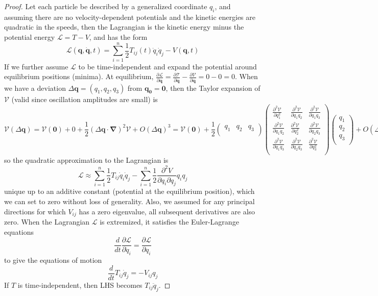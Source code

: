 \documentclass[a4paper]{article}
\begin{document}
\begin{proof}
Let each particle be described by a generalized coordinate $q_i$, and assuming there are no velocity-dependent potentials and the kinetic energies are quadratic in the speeds, then the Lagrangian is the kinetic energy minus the potential energy $\mathcal{L}=T-V$, and has the form
$$\mathcal{L}(\mathbf{q},\mathbf{\dot{q}},t)=\sum_{i=1}^n\frac{1}{2}T_{ij}(t)\dot{q}_i\dot{q}_j-V(\mathbf{q},t)$$
If we further assume $\mathcal{L}$ to be time-independent and expand the potential around equilibrium positions (minima). 
At equilibrium, $\frac{\partial\mathcal{L}}{\partial\mathbf{q}}=\frac{\partial\mathcal{T}}{\partial\mathbf{q}}-\frac{\partial\mathcal{V}}{\partial\mathbf{q}}=0-0=0$. When we have a deviation $\Delta\mathbf{q}=(q_1,q_2,q_3)$ from $\mathbf{q_0}=\boldsymbol{0}$, then the Taylor expansion of $\mathcal{V}$ (valid since oscillation amplitudes are small) is
$$\mathcal{V}(\Delta\mathbf{q})=\mathcal{V}(\boldsymbol{0})+0+\frac{1}{2}(\Delta\mathbf{q}\cdot\boldsymbol{\nabla})^2\mathcal{V}+O(\Delta\mathbf{q})^3=\mathcal{V}(\boldsymbol{0})+\frac{1}{2}\begin{pmatrix}q_1&q_2&q_3\\\end{pmatrix}\begin{pmatrix}\frac{\partial^2\mathcal{V}}{\partial q_1^2}&\frac{\partial^2\mathcal{V}}{\partial q_1q_2}&\frac{\partial^2\mathcal{V}}{\partial q_1q_3}\\\frac{\partial^2\mathcal{V}}{\partial q_1q_2}&\frac{\partial^2\mathcal{V}}{\partial q_2^2}&\frac{\partial^2\mathcal{V}}{\partial q_2q_3}\\\frac{\partial^2\mathcal{V}}{\partial q_1q_3}&\frac{\partial^2\mathcal{V}}{\partial q_2q_3}&\frac{\partial^2\mathcal{V}}{\partial q_3^2}\\\end{pmatrix}\begin{pmatrix}q_1\\q_2\\q_3\\\end{pmatrix}+O(\Delta\mathbf{q}^2)$$
so the quadratic approximation to the Lagrangian is $$\mathcal{L}\approx\sum_{i=1}^n\frac{1}{2}T_{ij}\dot{q}_i\dot{q}_j-\sum_{i=1}^n\frac{1}{2}\frac{\partial^2V}{\partial q_i\partial q_j}q_iq_j$$
unique up to an additive constant (potential at the equilibrium position), which we can set to zero without loss of generality. Also, we assumed for any principal directions for which $V_{ij}$ has a zero eigenvalue, all subsequent derivatives are also zero. When the Lagrangian $\mathcal{L}$ is extremized, it satisfies the Euler-Lagrange equations 
$$\frac{d}{dt}\frac{\partial\mathcal{L}}{\partial\dot{q}_i}=\frac{\partial\mathcal{L}}{\partial q_i}$$ to give the equations of motion
$$\frac{d}{dt}T_{ij}\dot{q}_j=-V_{ij}q_j$$
If $T$ is time-independent, then LHS becomes $T_{ij}\ddot{q}_j$.
\end{proof}
\end{document}
